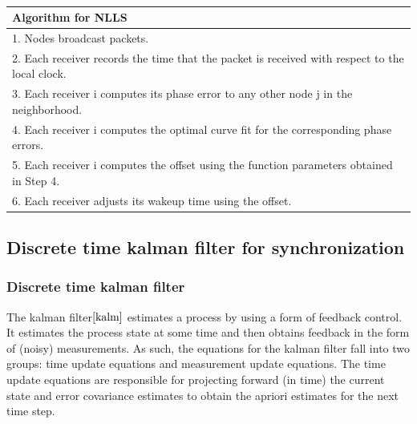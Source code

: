 \documentclass[a4paper,10pt]{report}
\begin{document}
\paragraph*{}
\begin{tabular}{  l }Algorithm for NLLS \\\hline \hline
1. Nodes broadcast packets. \\  2. Each receiver records the time that the packet is received with respect to the local clock. \\
3. Each receiver i computes its phase error to any other node j in the neighborhood. \\
4. Each receiver i computes the optimal curve fit for the corresponding phase errors. \\
5. Each receiver i computes the offset using the function parameters obtained in Step 4. \\
6. Each receiver adjusts its wakeup time using the offset.\\
\hline \hline
\end{tabular}
\subsection{\textbf{Discrete time kalman filter for synchronization}}
\subsubsection{Discrete time kalman filter}
The kalman filter$\cite{kalm}$ estimates a process by using a form of feedback control. It estimates the process state at some time and then obtains feedback in the form of (noisy) measurements. As such, the equations for the kalman filter fall into two groups: time
update equations and measurement update equations. The time update equations are responsible for projecting forward (in time) the
current state and error covariance estimates to obtain the apriori estimates for the next time step.
\end{document}
